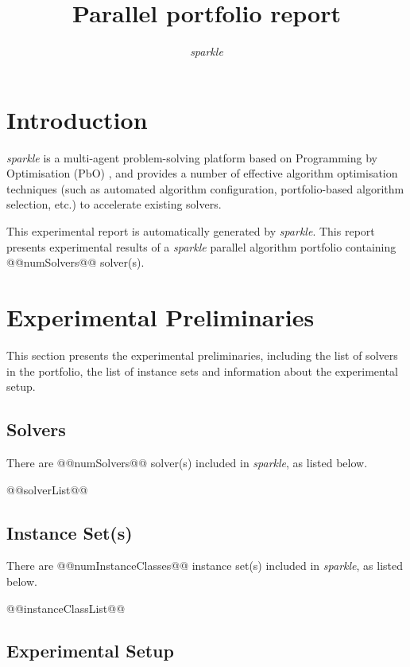 \documentclass[british]{article}
\title{Parallel portfolio report}
\author{ \emph{sparkle} }
\begin{document}
\maketitle %

\section{Introduction}
\label{sec:Introduction}

\emph{sparkle} \cite{Hoos15} is a multi-agent problem-solving platform based on Programming by Optimisation (PbO) \cite{Hoos12}, and provides a number of effective algorithm optimisation techniques (such as automated algorithm configuration, portfolio-based algorithm selection, etc.) to accelerate existing solvers.

This experimental report is automatically generated by \emph{sparkle}. This report presents experimental results of a \emph{sparkle} parallel algorithm portfolio containing @@numSolvers@@ solver(s).

\section{Experimental Preliminaries}
\label{sec:Experimental_Preliminaries}

This section presents the experimental preliminaries, including the list of solvers in the portfolio, the list of instance sets and information about the experimental setup.

\subsection{Solvers}
\label{sec:Solvers}
There are @@numSolvers@@ solver(s) included in \emph{sparkle}, as listed below.

\begin{enumerate}[nolistsep] 
@@solverList@@
\end{enumerate}

\subsection{Instance Set(s)}
\label{sec:Instance_Sets}
There are @@numInstanceClasses@@ instance set(s) included in \emph{sparkle}, as listed below.

\begin{enumerate}
@@instanceClassList@@
\end{enumerate}

\subsection{Experimental Setup}
\label{sec:Experimental_Setup}
\end{document}
